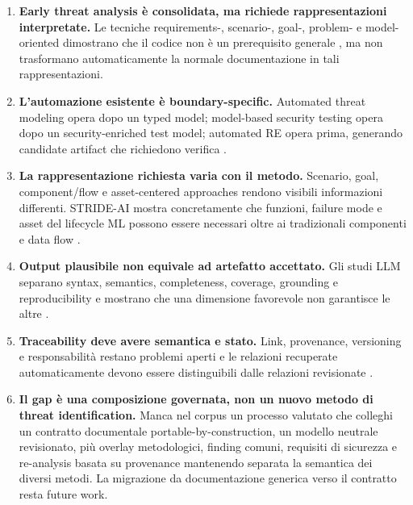 \documentclass[12pt,a4paper,oneside]{report}
\begin{document}
\begin{enumerate}[label=\arabic*.]
\item \textbf{Early threat analysis è consolidata, ma richiede rappresentazioni interpretate.} Le tecniche requirements-, scenario-, goal-, problem- e model-oriented dimostrano che il codice non è un prerequisito generale \citep{tuma2018threatanalysis}, ma non trasformano automaticamente la normale documentazione in tali rappresentazioni.

\item \textbf{L'automazione esistente è boundary-specific.} Automated threat modeling opera dopo un typed model; model-based security testing opera dopo un security-enriched test model; automated RE opera prima, generando candidate artifact che richiedono verifica \citep{granata2024automatedthreatmodelling,lonetti2023mbstiot,umar2024automatedrequirements}.

\item \textbf{La rappresentazione richiesta varia con il metodo.} Scenario, goal, component/flow e asset-centered approaches rendono visibili informazioni differenti. STRIDE-AI mostra concretamente che funzioni, failure mode e asset del lifecycle ML possono essere necessari oltre ai tradizionali componenti e data flow \citep{mauri2022strideai}.

\item \textbf{Output plausibile non equivale ad artefatto accettato.} Gli studi LLM separano syntax, semantics, completeness, coverage, grounding e reproducibility e mostrano che una dimensione favorevole non garantisce le altre \citep{ferrari2024modelgeneration,garaccione2025llmcomparison,abualhaija2025regulatory,angermeir2026reproducibility}.

\item \textbf{Traceability deve avere semantica e stato.} Link, provenance, versioning e responsabilità restano problemi aperti e le relazioni recuperate automaticamente devono essere distinguibili dalle relazioni revisionate \citep{mucha2024prers,ruiz2023whydontwetrace,grosser2022documentrelations,wang2024rctlrsota}.

\item \textbf{Il gap è una composizione governata, non un nuovo metodo di threat identification.} Manca nel corpus un processo valutato che colleghi un contratto documentale portable-by-construction, un modello neutrale revisionato, più overlay metodologici, finding comuni, requisiti di sicurezza e re-analysis basata su provenance mantenendo separata la semantica dei diversi metodi. La migrazione da documentazione generica verso il contratto resta future work.
\end{enumerate}
\end{document}
